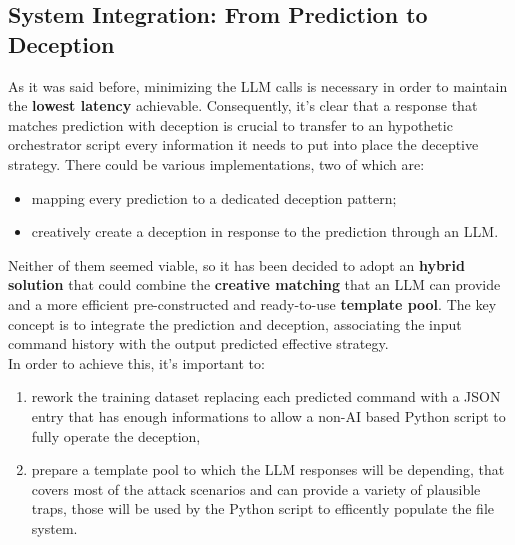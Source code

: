 \documentclass[10pt,a4paper,twocolumn]{article}
\begin{document}
\subsection{System Integration: From Prediction to Deception} %
As it was said before, minimizing the LLM calls is necessary in order to maintain the \textbf{lowest latency} achievable.
Consequently, it's clear that a response that matches prediction with deception is crucial to transfer to an hypothetic orchestrator script every information it needs to put into place the deceptive strategy.
There could be various implementations, two of which are:
\begin{itemize}
    \item mapping every prediction to a dedicated deception pattern;
    \item creatively create a deception in response to the prediction through an LLM.
\end{itemize}
Neither of them seemed viable, so it has been decided to adopt an \textbf{hybrid solution} that could combine the \textbf{creative matching} that an LLM can provide and a more efficient pre-constructed and ready-to-use \textbf{template pool}. The key concept is to integrate the prediction and deception, associating the input command history with the output predicted effective strategy.\\
In  order to achieve this, it's important to:
\begin{enumerate}
    \item rework the training dataset replacing each predicted command with a JSON entry that has enough informations to allow a non-AI based Python script to fully operate the deception,
    \item prepare a template pool to which the LLM responses will be depending, that covers most of the attack scenarios and can provide a variety of plausible traps, those will be used by the Python script to efficently populate the file system. 
    \end{enumerate} 
\end{document}
